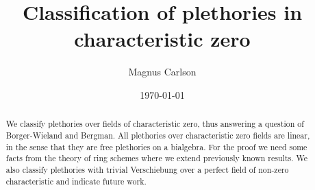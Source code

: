 \documentclass[a4paper, 12pt]{amsart}
\numberwithin{equation}{section}
\theoremstyle{definition}
\begin{document}

%






\author{Magnus Carlson}

\address{}




\newcommand{\Spec}{\text{Spec }}

\title[Classification of plethories in characteristic zero]{Classification of plethories in characteristic zero}





\begin{abstract}
\noindent We classify plethories over fields of characteristic zero, thus answering a
question of Borger-Wieland and Bergman. All plethories over
characteristic zero fields are linear, in the sense that they are free
plethories on a bialgebra. For the proof we need some facts from the theory of ring schemes where we extend previously known results. We also classify plethories with trivial Verschiebung over a
perfect field of non-zero characteristic and indicate future work. 
\end{abstract}


\date{\today}



\maketitle
\tableofcontents
\end{document}
